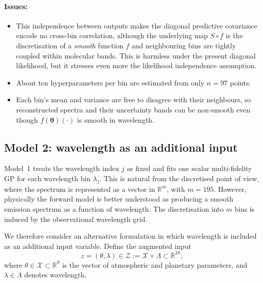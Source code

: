 \documentclass[11pt,a4paper]{article}
\begin{document}
\paragraph{Issues:}
\begin{itemize}
    \item This independence between outputs makes the diagonal predictive covariance encode no cross-bin correlation, although the underlying map
    $S\circ f$ is the discretisation of a \emph{smooth} function $f$ and neighbouring bins are tightly coupled
    within molecular bands. This is
    harmless under the present diagonal likelihood, but it stresses even more the likelihood independence assumption.
    \item About ten hyperparameters per bin are estimated from only $n=97$ points. 
    \item Each bin's mean and variance are free to disagree with their neighbours, so reconstructed spectra and their uncertainty bands can be non-smooth even though $f(\boldsymbol\theta)(\cdot)$ is smooth in wavelength.
\end{itemize}


\subsection{Model 2: wavelength as an additional input}
\label{subsec:model2-wavelength-input}

Model~1 treats the wavelength index \(j\) as fixed and fits one scalar
multi-fidelity GP for each wavelength bin \(\lambda_j\). This is natural
from the discretised point of view, where the spectrum is represented as
a vector in \(\mathbb R^m\), with \(m=195\). However, physically the
forward model is better understood as producing a smooth emission spectrum
as a function of wavelength. The discretisation into \(m\) bins is induced
by the observational wavelength grid.

We therefore consider an alternative formulation in which wavelength is
included as an additional input variable. Define the augmented input
\[
    z = (\theta,\lambda)
    \in
    \mathcal Z
    :=
    \mathcal X \times \Lambda
    \subset \mathbb R^{10},
\]
where \(\theta \in \mathcal{X}\subset \mathbb{R}^9\) is the vector of atmospheric and planetary parameters, and
\(\lambda\in\Lambda\) denotes wavelength.
\end{document}
